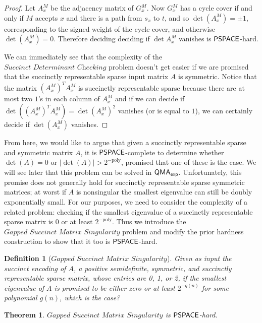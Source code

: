 \documentclass[11pt]{article}
\newtheorem{theorem}{Theorem}
\newtheorem{definition}{Definition}
\theoremstyle{definition}
\theoremstyle{remark}
\newcommand\PSPACE{{\sf{PSPACE}}}
\newcommand\QMAexp{{\sf{QMA}_{exp}}}
\newcommand\succdet{\textit{Succinct Determinant Checking}}
\newcommand\gappedsucc{\textit{Gapped Succinct Matrix Singularity}}
\newcommand{\poly}{\textrm{poly}}
\begin{document}
\begin{proof}
Let $A^M_x$ be the adjacency matrix of $G_x^M$.  Now $G^M_x$ has a cycle cover if and only if $M$ accepts $x$ and there is a path from $s_x$ to $t$, and so $\det(A^M_x) = \pm 1$, corresponding to the signed weight of the cycle cover, and otherwise $\det(A^M_x) = 0$. Therefore deciding deciding if $\det{A^M_x}$ vanishes is $\PSPACE$-hard.	

We can immediately see that the complexity of the $\succdet$ problem doesn't get easier if we are promised that the succinctly representable sparse input matrix $A$ is symmetric.  Notice that the  matrix $(A^M_x)^T A^M_x$ is succinctly representable sparse because there are at most two $1$'s in each column of $A^M_x$ and if we can decide if $\det((A^M_x)^T A^M_x)=\det(A^M_x)^2$ vanishes (or is equal to $1$), we can certainly decide if $\det(A^M_x)$ vanishes. 
\end{proof}
From here, we would like to argue that given a succinctly representable sparse and symmetric matrix $A$, it is $\PSPACE$-complete to determine whether $\det(A) = 0$ or $|\det(A)| > 2^{-\text{poly}}$, promised that one of these is the case. We will see later that this problem can be solved in $\QMAexp$. Unfortunately, this promise does not generally hold for succinctly representable sparse symmetric matrices; at worst if $A$ is nonsingular the smallest eigenvalue can still be doubly exponentially small. For our purposes, we need to consider the complexity of a related problem: checking if the smallest eigenvalue of a succinctly representable sparse matrix is $0$ or at least $2^{-\poly}$.  Thus we introduce the $\gappedsucc$ problem and modify the prior hardness construction to show that it too is $\PSPACE$-hard.
\begin{definition}[$\gappedsucc$]
Given as input the succinct encoding of $A$, a positive semidefinite, symmetric, and succinctly representable sparse matrix, whose entries are 0, 1, or 2, if the smallest eigenvalue of $A$ is promised to be either zero or at least $2^{-g(n)}$ for some polynomial $g(n)$, which is the case?
\end{definition}
\begin{theorem}\label{thm:gappedsucc}
$\gappedsucc$ is $\PSPACE$-hard.
\end{theorem}
\end{document}
